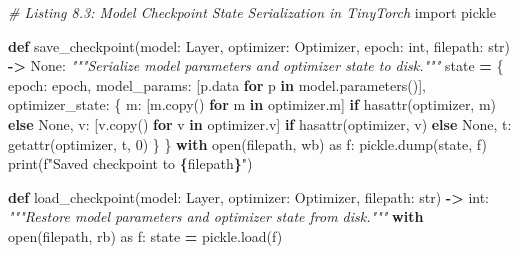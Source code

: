 \documentclass[
  letterpaper,
]{scrbook}
\newenvironment{Shaded}{\begin{snugshade}}{\end{snugshade}}
\newcommand{\BuiltInTok}[1]{#1}
\newcommand{\CommentTok}[1]{\textcolor[rgb]{0.56,0.35,0.01}{\textit{#1}}}
\newcommand{\ControlFlowTok}[1]{\textcolor[rgb]{0.13,0.29,0.53}{\textbf{#1}}}
\newcommand{\DecValTok}[1]{\textcolor[rgb]{0.00,0.00,0.81}{#1}}
\newcommand{\ImportTok}[1]{#1}
\newcommand{\KeywordTok}[1]{\textcolor[rgb]{0.13,0.29,0.53}{\textbf{#1}}}
\newcommand{\NormalTok}[1]{#1}
\newcommand{\OperatorTok}[1]{\textcolor[rgb]{0.81,0.36,0.00}{\textbf{#1}}}
\newcommand{\SpecialCharTok}[1]{\textcolor[rgb]{0.81,0.36,0.00}{\textbf{#1}}}
\newcommand{\SpecialStringTok}[1]{\textcolor[rgb]{0.31,0.60,0.02}{#1}}
\newcommand{\StringTok}[1]{\textcolor[rgb]{0.31,0.60,0.02}{#1}}
\newcommand{\VariableTok}[1]{\textcolor[rgb]{0.00,0.00,0.00}{#1}}
\begin{document}
\begin{Shaded}
\begin{Highlighting}[]
\CommentTok{\# Listing 8.3: Model Checkpoint State Serialization in TinyTorch}
\ImportTok{import}\NormalTok{ pickle}

\KeywordTok{def}\NormalTok{ save\_checkpoint(model: Layer, optimizer: Optimizer, epoch: }\BuiltInTok{int}\NormalTok{, filepath: }\BuiltInTok{str}\NormalTok{) }\OperatorTok{{-}\textgreater{}} \VariableTok{None}\NormalTok{:}
    \CommentTok{"""Serialize model parameters and optimizer state to disk."""}
\NormalTok{    state }\OperatorTok{=}\NormalTok{ \{}
        \StringTok{\textquotesingle{}epoch\textquotesingle{}}\NormalTok{: epoch,}
        \StringTok{\textquotesingle{}model\_params\textquotesingle{}}\NormalTok{: [p.data }\ControlFlowTok{for}\NormalTok{ p }\KeywordTok{in}\NormalTok{ model.parameters()],}
        \StringTok{\textquotesingle{}optimizer\_state\textquotesingle{}}\NormalTok{: \{}
            \StringTok{\textquotesingle{}m\textquotesingle{}}\NormalTok{: [m.copy() }\ControlFlowTok{for}\NormalTok{ m }\KeywordTok{in}\NormalTok{ optimizer.m] }\ControlFlowTok{if} \BuiltInTok{hasattr}\NormalTok{(optimizer, }\StringTok{\textquotesingle{}m\textquotesingle{}}\NormalTok{) }\ControlFlowTok{else} \VariableTok{None}\NormalTok{,}
            \StringTok{\textquotesingle{}v\textquotesingle{}}\NormalTok{: [v.copy() }\ControlFlowTok{for}\NormalTok{ v }\KeywordTok{in}\NormalTok{ optimizer.v] }\ControlFlowTok{if} \BuiltInTok{hasattr}\NormalTok{(optimizer, }\StringTok{\textquotesingle{}v\textquotesingle{}}\NormalTok{) }\ControlFlowTok{else} \VariableTok{None}\NormalTok{,}
            \StringTok{\textquotesingle{}t\textquotesingle{}}\NormalTok{: }\BuiltInTok{getattr}\NormalTok{(optimizer, }\StringTok{\textquotesingle{}t\textquotesingle{}}\NormalTok{, }\DecValTok{0}\NormalTok{)}
\NormalTok{        \}}
\NormalTok{    \}}
    \ControlFlowTok{with} \BuiltInTok{open}\NormalTok{(filepath, }\StringTok{\textquotesingle{}wb\textquotesingle{}}\NormalTok{) }\ImportTok{as}\NormalTok{ f:}
\NormalTok{        pickle.dump(state, f)}
    \BuiltInTok{print}\NormalTok{(}\SpecialStringTok{f"Saved checkpoint to }\SpecialCharTok{\{}\NormalTok{filepath}\SpecialCharTok{\}}\SpecialStringTok{"}\NormalTok{)}

\KeywordTok{def}\NormalTok{ load\_checkpoint(model: Layer, optimizer: Optimizer, filepath: }\BuiltInTok{str}\NormalTok{) }\OperatorTok{{-}\textgreater{}} \BuiltInTok{int}\NormalTok{:}
    \CommentTok{"""Restore model parameters and optimizer state from disk."""}
    \ControlFlowTok{with} \BuiltInTok{open}\NormalTok{(filepath, }\StringTok{\textquotesingle{}rb\textquotesingle{}}\NormalTok{) }\ImportTok{as}\NormalTok{ f:}
\NormalTok{        state }\OperatorTok{=}\NormalTok{ pickle.load(f)}


\end{Highlighting}
\end{Shaded}
\end{document}
